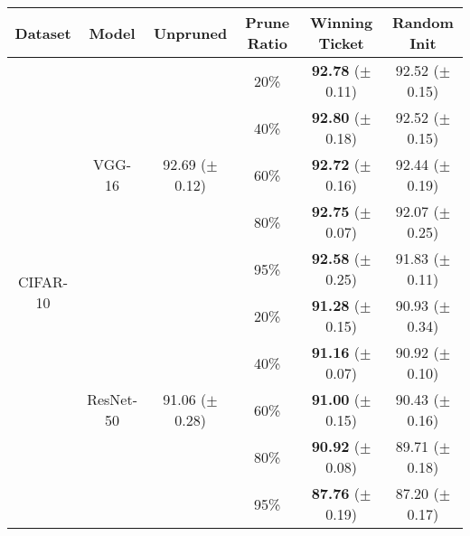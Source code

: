 \begin{table}[!htbp]
\begin{subtable}[b]{\textwidth}
\centering
\small
\begin{tabular}{c|c|cccc}
\hline
Dataset                    & Model                   & Unpruned          & Prune Ratio & Winning Ticket       & Random Init          \\ \hline
\multirow{10}{*}{CIFAR-10} & \multirow{5}{*}{VGG-16} & \multirow{5}{*}{92.69 ($\pm$0.12)}  & 20\%        & \textbf{92.78} ($\pm$0.11)           & 92.52 ($\pm$0.15)           \\
                           &                         &             & 40\%        & \textbf{92.80} ($\pm$0.18)           & 92.52 ($\pm$0.15)           \\
                           &                         &               & 60\%       & \textbf{92.72} ($\pm$0.16)           & 92.44 ($\pm$0.19)           \\
 &                         &               & 80\%       & \textbf{92.75} ($\pm$0.07)           & 92.07 ($\pm$0.25)           \\
  &                         &               & 95\%       & \textbf{92.58} ($\pm$0.25)           & 91.83 ($\pm$0.11)           \\ \cline{2-6} & \multirow{5}{*}{ResNet-50} & \multirow{5}{*}{91.06 ($\pm$0.28)}   & 20\%        & \textbf{91.28} ($\pm$0.15)           & 90.93 ($\pm$0.34)           \\
                           &                         &             & 40\%        & \textbf{91.16} ($\pm$0.07)           & 90.92 ($\pm$0.10)           \\
                           &                         &               & 60\%       & \textbf{91.00} ($\pm$0.15)           & 90.43 ($\pm$0.16)           \\
 &                         &               & 80\%       & \textbf{90.92} ($\pm$0.08)           & 89.71 ($\pm$0.18) \\
  &                         &               & 95\%       & \textbf{87.76} ($\pm$0.19)           & 87.20 ($\pm$0.17) \\ \hline

\end{tabular}
\end{subtable}
\end{table}
